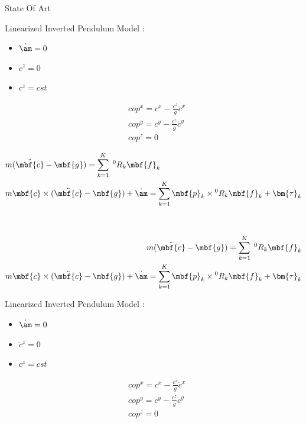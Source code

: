 \begin{frame}{State Of Art}
\vspace*{-0.7cm}
\begin{small}

\begin{minipage}{0.4\textwidth}
\begin{minipage}{0.4\textwidth}
Linearized Inverted Pendulum Model :
\begin{itemize}
\item $\dot{\bf \am} = 0$
\item $\ddot{c}^z = 0$
\item $c^z = cst$
\end{itemize}
\end{minipage}
\begin{minipage}{0.2\textwidth}
\begin{align*}
& cop^x = {c}^x - \frac{c^z}{g}\ddot{c}^x \\
& cop^y = {c}^y - \frac{c^z}{g}\ddot{c}^y \\
& cop^z = 0
\end{align*}
\end{minipage}
\end{minipage}
%
\begin{minipage}{0.4\textwidth}
\begin{align*}
&m (\ddot{\mbf{c}}-\mbf{g}) = \sum\limits_{k=1}^{K} \; {^0}R_k \mbf{f}_k
\\
&m \mbf{c} \times (\ddot{\mbf{c}}-\mbf{g}) + \dot{\bf \am} = \sum\limits_{k=1}^{K} \mbf{p}_k \times {^0}R_k \mbf{f}_k  + \bm{\tau}_k
\end{align*}
\end{minipage}\\
%
\begin{minipage}{0.4\textwidth}
\begin{align*}
m (\ddot{\mbf{c}}-\mbf{g}) = \sum\limits_{k=1}^{K} \; {^0}R_k \mbf{f}_k
\\
m \mbf{c} \times (\ddot{\mbf{c}}-\mbf{g}) + \dot{\bf \am} = \sum\limits_{k=1}^{K} \mbf{p}_k \times {^0}R_k \mbf{f}_k  + \bm{\tau}_k
\end{align*}
\end{minipage}
%
\begin{minipage}{0.4\textwidth}
\begin{minipage}{0.4\textwidth}
Linearized Inverted Pendulum Model :
\begin{itemize}
\item $\dot{\bf \am} = 0$
\item $\ddot{c}^z = 0$
\item $c^z = cst$
\end{itemize}
\end{minipage}
\begin{minipage}{0.2\textwidth}
\begin{align*}
& cop^x = {c}^x - \frac{c^z}{g}\ddot{c}^x \\
& cop^y = {c}^y - \frac{c^z}{g}\ddot{c}^y \\
& cop^z = 0
\end{align*}
\end{minipage}
\end{minipage}


\end{small}
\end{frame}
